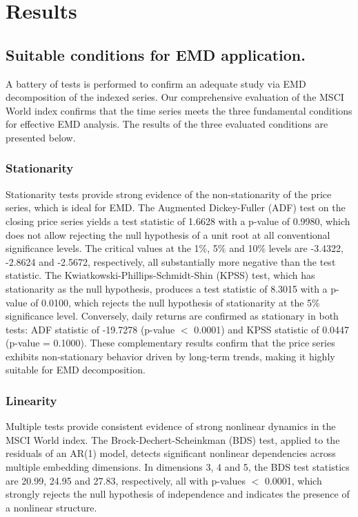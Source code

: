 \documentclass[11pt,a4paper]{article}
\begin{document}
\section{Results}
\label{sec:results}

\subsection{Suitable conditions for EMD application.}
\label{sec:suitcondemd}

A battery of tests is performed to confirm an adequate study via EMD decomposition of the indexed series. Our comprehensive evaluation of the MSCI World index confirms that the time series meets the three fundamental conditions for effective EMD analysis. The results of the three evaluated conditions are presented below.

\subsubsection{Stationarity}
Stationarity tests provide strong evidence of the non-stationarity of the price series, which is ideal for EMD. The Augmented Dickey-Fuller (ADF) test on the closing price series yields a test statistic of 1.6628 with a p-value of 0.9980, which does not allow rejecting the null hypothesis of a unit root at all conventional significance levels. The critical values at the 1\%, 5\% and 10\% levels are -3.4322, -2.8624 and -2.5672, respectively, all substantially more negative than the test statistic. The Kwiatkowski-Phillips-Schmidt-Shin (KPSS) test, which has stationarity as the null hypothesis, produces a test statistic of 8.3015 with a p-value of 0.0100, which rejects the null hypothesis of stationarity at the 5\% significance level. Conversely, daily returns are confirmed as stationary in both tests: ADF statistic of -19.7278 (p-value $<$ 0.0001) and KPSS statistic of 0.0447 (p-value = 0.1000). These complementary results confirm that the price series exhibits non-stationary behavior driven by long-term trends, making it highly suitable for EMD decomposition.

\subsubsection{Linearity}
Multiple tests provide consistent evidence of strong nonlinear dynamics in the MSCI World index. The Brock-Dechert-Scheinkman (BDS) test, applied to the residuals of an AR(1) model, detects significant nonlinear dependencies across multiple embedding dimensions. In dimensions 3, 4 and 5, the BDS test statistics are 20.99, 24.95 and 27.83, respectively, all with p-values $<$ 0.0001, which strongly rejects the null hypothesis of independence and indicates the presence of a nonlinear structure.
\end{document}
